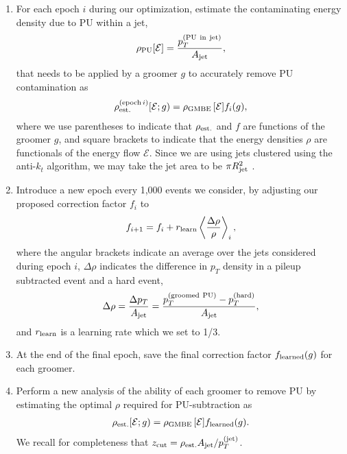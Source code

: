 \begin{enumerate}
    \item
    For each epoch \(i\) during our optimization, estimate the contaminating energy density due to PU within a jet,
    \begin{align}
        \rho_{\rm PU}[\mathcal E] = \frac{p_T^{\rm (PU~in~jet)}}{A_{\rm jet}}
        ,
    \end{align}
    that needs to be applied by a groomer \(g\) to accurately remove PU contamination as
    \begin{align}
        \rho^{{\rm(epoch}\,i)}_{\rm est.}[\mathcal E ; g)
        =
        \rho_{\rm GMBE}\,[\mathcal E] f_i(g)
        ,
    \end{align}
    where we use parentheses to indicate that \(\rho_{\rm est.}\) and \(f\) are functions of the groomer \(g\), and square brackets to indicate that the energy densities \(\rho\) are functionals of the energy flow \(\mathcal E\).
    Since we are using jets clustered using the anti-\(k_t\) algorithm, we may take the jet area to be \(\pi R_{\rm jet}^2\) \cite{Cacciari:2008gp}.

    \item
    Introduce a new epoch every 1,000 events we consider, by adjusting our proposed correction factor \(f_i\) to
    \begin{align}
        f_{i + 1}
        =
        f_i + r_{\rm learn}
        \left\langle \frac{\Delta \rho}{\rho} \right\rangle_i
        \label{eqn:epochcorrectionfactor}
        ,
    \end{align}
    where the angular brackets indicate an average over the jets considered during epoch \(i\), \(\Delta \rho\) indicates the difference in \(p_T\) density in a pileup subtracted event and a hard event,
    \begin{align}
        \Delta \rho
        =
        \frac{\Delta p_T}{A_{\rm jet}}
        =
        \frac{p_T^{\rm(groomed~PU)} - p_T^{\rm(hard)}}{A_{\rm jet}}
        ,
    \end{align}
    and \(r_{\rm learn}\) is a learning rate which we set to 1/3.


    \item
    At the end of the final epoch, save the final correction factor \(f_{\rm learned}(g)\) for each groomer.

    \item
    Perform a new analysis of the ability of each groomer to remove PU by estimating the optimal \(\rho\) required for PU-subtraction as
    \begin{align}
        \rho_{\rm est.}[\mathcal E ; g)
        =
        \rho_{\rm GMBE}\,[\mathcal E] f_{\rm learned}(g)
        .
    \end{align}
    We recall for completeness that \(
    	z_{\rm cut}
	=
	\rho_{\rm est.} A_{\rm jet}/p_T^{(\rm jet)}
    \).

\end{enumerate}



